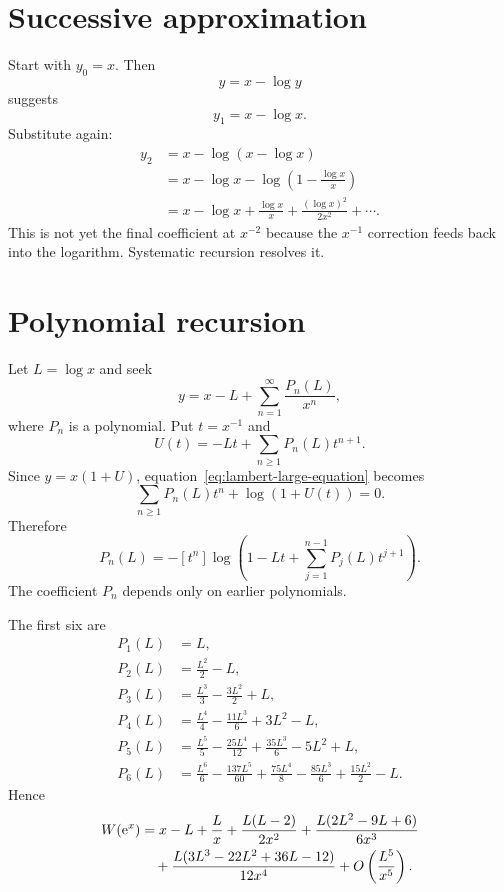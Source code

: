 \documentclass[11pt,oneside]{book}
\theoremstyle{definition}
\theoremstyle{remark}
\newcommand{\e}{\mathrm{e}}
\newcommand{\bigO}{O}
\begin{document}
\section{Successive approximation}

Start with $y_0=x$. Then
\[
  y=x-\log y
\]
suggests
\[
  y_1=x-\log x.
\]
Substitute again:
\begin{align*}
  y_2
  &=x-\log(x-\log x)\\
  &=x-\log x-
    \log\left(1-\frac{\log x}{x}\right)\\
  &=x-\log x+\frac{\log x}{x}
    +\frac{(\log x)^2}{2x^2}+\cdots.
\end{align*}
This is not yet the final coefficient at $x^{-2}$ because the $x^{-1}$
correction feeds back into the logarithm. Systematic recursion resolves it.

\section{Polynomial recursion}

Let $L=\log x$ and seek
\begin{equation}
  y=x-L+\sum_{n=1}^{\infty}\frac{P_n(L)}{x^n},
  \label{eq:W-large-ansatz}
\end{equation}
where $P_n$ is a polynomial. Put $t=x^{-1}$ and
\[
  U(t)=-Lt+\sum_{n\ge1}P_n(L)t^{n+1}.
\]
Since $y=x(1+U)$, equation~\eqref{eq:lambert-large-equation} becomes
\[
  \sum_{n\ge1}P_n(L)t^n+\log(1+U(t))=0.
\]
Therefore
\begin{equation}
  P_n(L)=-[t^n]\log\left(
    1-Lt+\sum_{j=1}^{n-1}P_j(L)t^{j+1}
  \right).
  \label{eq:Pn-recursion}
\end{equation}
The coefficient $P_n$ depends only on earlier polynomials.

The first six are
\begin{align*}
 P_1(L)&=L,\\
 P_2(L)&=\frac{L^2}{2}-L,\\
 P_3(L)&=\frac{L^3}{3}-\frac{3L^2}{2}+L,\\
 P_4(L)&=\frac{L^4}{4}-\frac{11L^3}{6}+3L^2-L,\\
 P_5(L)&=\frac{L^5}{5}-\frac{25L^4}{12}
          +\frac{35L^3}{6}-5L^2+L,\\
 P_6(L)&=\frac{L^6}{6}-\frac{137L^5}{60}
          +\frac{75L^4}{8}-\frac{85L^3}{6}
          +\frac{15L^2}{2}-L.
\end{align*}
Hence
\begin{align}
 W(\e^x)
 &=x-L+\frac{L}{x}
 +\frac{L(L-2)}{2x^2}
 +\frac{L(2L^2-9L+6)}{6x^3}
 \notag\\
 &\quad
 +\frac{L(3L^3-22L^2+36L-12)}{12x^4}
 +\bigO\left(\frac{L^5}{x^5}\right).
 \label{eq:W-large-expansion}
\end{align}
\end{document}
